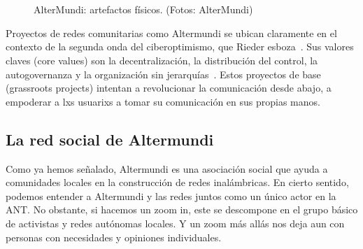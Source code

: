 \begin{figure}[tb]
\centering
{} \quad
{} \\
 \quad
{} \\
 \quad
{}
\caption[A number of pictures.]{AlterMundi: artefactos físicos. (Fotos: AlterMundi)} %
\label{fig:esempio}
\end{figure}

Proyectos de redes comunitarias como Altermundi se ubican claramente en el contexto de la segunda onda del ciberoptimismo, que Rieder esboza~\autocite{Rieder2012}.
Sus valores claves (core values) son la decentralización, la distribución del control, la autogovernanza y la organización sin jerarquías~\autocite{FiTre2015}.
Estos proyectos de base (grassroots projects) intentan a revolucionar la comunicación desde abajo, a empoderar a lxs usuarixs a tomar su comunicación en sus propias manos.

\begin{comment}
* community network projects: are to be found in the context of (2nd wave) cyber optimism: "decentralization", "distributed control", "self-governance", "non-hierarchical organization"
an attempt at a capillary revolution -> ist es erfolgreich?
\end{comment}


\subsection{La red social de Altermundi}

Como ya hemos señalado, Altermundi es una asociación social que ayuda a comunidades locales en la construcción de redes inalámbricas.
En cierto sentido, podemos entender a Altermundi y las redes juntos como un único actor en la ANT.
No obstante, si hacemos un zoom in, este se descompone en el grupo básico de activistas y redes autónomas locales.
Y un zoom más allás nos deja aun con personas con necesidades y opiniones individuales.

